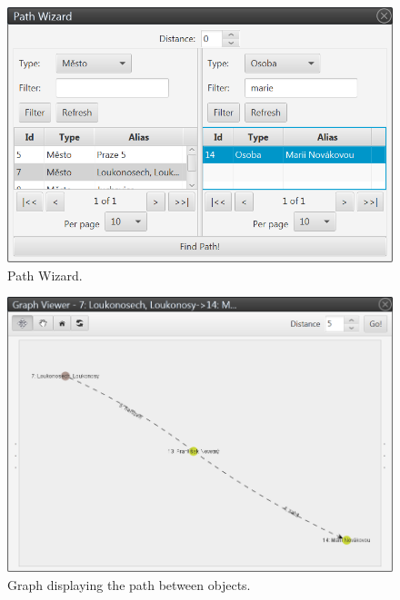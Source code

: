 \begin{figure}[!htb]
        \centering
        \includegraphics[width=\textwidth]{Images/path}
        \caption{Path Wizard.}
        \label{fig:Path}
\end{figure}

\begin{figure}[!htb]
        \centering
        \includegraphics[width=\textwidth]{Images/pathgraph}
        \caption{Graph displaying the path between objects.}
        \label{fig:PathGraph}
\end{figure}

